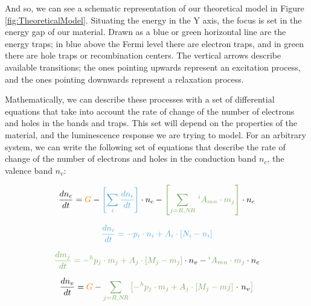 And so, we can see a schematic representation of our theoretical model in Figure \ref{fig:TheoreticalModel}. Situating the energy in the Y axis, the focus is set in the energy gap of our material. Drawn as a blue or green horizontal line are the energy traps; in blue above the Fermi level there are electron traps, and in green there are hole traps or recombination centers. The vertical arrows describe available transitions; the ones pointing upwards represent an excitation process, and the ones pointing downwards represent a relaxation process. 

\vspace{10pt}

Mathematically, we can describe these processes with a set of differential equations that take into account the rate of change of the number of electrons and holes in the bands and traps. This set will depend on the properties of the material, and the luminescence response we are trying to model. For an arbitrary system, we can write the following set of equations that describe the rate of change of the number of electrons and holes in the conduction band $n_c$, the valence band $n_v$:
\vspace{10pt}

\begin{equation} \label{eq:dn_cdt}
  \frac{dn_c}{dt} = \textcolor{orange}{G} - \textcolor{customblue}{\left[\sum_i \frac{dn_i}{dt}\right]} \cdot n_c - \textcolor{customgreen}{\left[ \sum_{j=R, N\!R}\, ^iA_{mn} \cdot m_j \right]} \cdot n_c
\end{equation}

\begin{equation} \label{eq:dn_idt}
  \textcolor{customblue}{\frac{dn_i}{dt} = -p_i \cdot n_i + A_i \cdot [N_i - n_i]}
\end{equation}

\begin{equation} \label{eq:dm_jdt}
  \textcolor{customgreen}{\frac{dm_j}{dt} = -^hp_j \cdot m_j + A_j \cdot [M_j - m_j]} \cdot n_v - \textcolor{customgreen}{^iA_{mn} \cdot m_j} \cdot n_c
\end{equation}

\begin{equation} \label{eq:dn_vdt}
  \frac{dn_v}{dt} = \textcolor{orange}{G} - \textcolor{customgreen}{\sum_{j=R, N\!R} \left[-^hp_j \cdot m_j + A_j \cdot [M_j - mj] \textcolor{black}{~ \cdot ~n_v}\right]} 
\end{equation}

